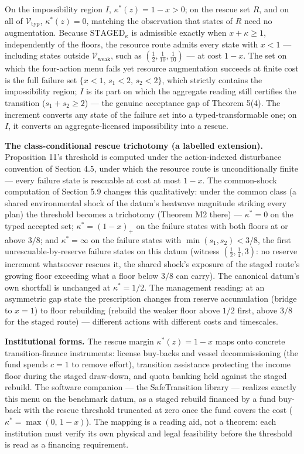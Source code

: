 \documentclass[3p,11pt]{elsarticle}
\begin{document}
On the impossibility region \(I\), \(\kappa^*(z) = 1 - x > 0\); on the rescue set \(R\), and on all of \(\mathcal{V}_{\mathrm{typ}}\), \(\kappa^*(z) = 0\), matching the observation that states of \(R\) need no augmentation. Because \(\mathrm{STAGED}_\kappa\) is admissible exactly when \(x + \kappa \ge 1\), independently of the floors, the resource route admits every state with \(x < 1\) --- including states outside \(\mathcal{V}_{\mathrm{weak}}\), such as \((\tfrac12, \tfrac1{10}, \tfrac1{10})\) --- at cost \(1 - x\). The set on which the four-action menu fails yet resource augmentation succeeds at finite cost is the full failure set \(\{x < 1,\, s_1 < 2,\, s_2 < 2\}\), which strictly contains the impossibility region; \(I\) is its part on which the aggregate reading still certifies the transition (\(s_1 + s_2 \ge 2\)) --- the genuine acceptance gap of Theorem 5(4). The increment converts any state of the failure set into a typed-transformable one; on \(I\), it converts an aggregate-licensed impossibility into a rescue.

\textbf{The class-conditional rescue trichotomy (a labelled
extension).} Proposition 11's threshold is computed under the
action-indexed disturbance convention of Section 4.5, under which the
resource route is unconditionally finite --- every failure state is
rescuable at cost at most \(1 - x\). The common-shock computation of
Section 5.9 changes this qualitatively: under the common class (a shared
environmental shock of the datum's heatwave magnitude striking every
plan) the threshold becomes a trichotomy (Theorem M2 there) ---
\(\kappa^* = 0\) on the typed accepted set; \(\kappa^* = (1 - x)_+\) on
the failure states with both floors at or above \(3/8\); and
\(\kappa^* = \infty\) on the failure states with \(\min(s_1, s_2) <
3/8\), the first unrescuable-by-reserve failure states on this datum
(witness \((\tfrac12, \tfrac14, 3)\): no reserve increment whatsoever
rescues it, the shared shock's exposure of the staged route's growing
floor exceeding what a floor below \(3/8\) can carry). The canonical
datum's own shortfall is unchanged at \(\kappa^* = 1/2\). The
management reading: at an asymmetric gap state the prescription changes
from reserve accumulation (bridge to \(x = 1\)) to floor rebuilding
(rebuild the weaker floor above \(1/2\) first, above \(3/8\) for the
staged route) --- different actions with different costs and timescales.

\textbf{Institutional forms.} The rescue margin \(\kappa^*(z) = 1 - x\)
maps onto concrete transition-finance instruments: license buy-backs and
vessel decommissioning (the fund spends \(c = 1\) to remove effort),
transition assistance protecting the income floor during the staged
draw-down, and quota banking held against the staged rebuild. The
software companion --- the SafeTransition library --- realizes exactly
this menu on the benchmark datum, as a staged rebuild financed by a fund
buy-back with the rescue threshold truncated at zero once the fund covers
the cost (\(\kappa^* = \max(0,\, 1 - x)\)). The mapping is a reading
aid, not a theorem: each institution must verify its own physical and
legal feasibility before the threshold is read as a financing requirement.
\end{document}
